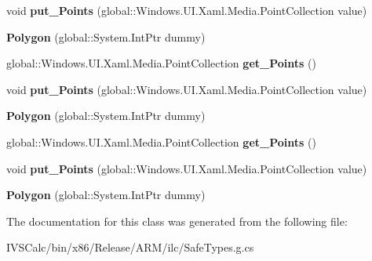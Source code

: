 \begin{DoxyCompactItemize}
\item 
\mbox{\label{class_windows_1_1_u_i_1_1_xaml_1_1_shapes_1_1_polygon_a6e9071faca39d4aa0570ba72edba9c6c}} 
void {\bfseries put\+\_\+\+Points} (global\+::\+Windows.\+U\+I.\+Xaml.\+Media.\+Point\+Collection value)
\item 
\mbox{\label{class_windows_1_1_u_i_1_1_xaml_1_1_shapes_1_1_polygon_a7ac83122ba7ccd42efd565804bca2d0a}} 
{\bfseries Polygon} (global\+::\+System.\+Int\+Ptr dummy)
\item 
\mbox{\label{class_windows_1_1_u_i_1_1_xaml_1_1_shapes_1_1_polygon_afd4470cca2e8e02dfe5091d16a91f6bd}} 
global\+::\+Windows.\+U\+I.\+Xaml.\+Media.\+Point\+Collection {\bfseries get\+\_\+\+Points} ()
\item 
\mbox{\label{class_windows_1_1_u_i_1_1_xaml_1_1_shapes_1_1_polygon_a6e9071faca39d4aa0570ba72edba9c6c}} 
void {\bfseries put\+\_\+\+Points} (global\+::\+Windows.\+U\+I.\+Xaml.\+Media.\+Point\+Collection value)
\item 
\mbox{\label{class_windows_1_1_u_i_1_1_xaml_1_1_shapes_1_1_polygon_a7ac83122ba7ccd42efd565804bca2d0a}} 
{\bfseries Polygon} (global\+::\+System.\+Int\+Ptr dummy)
\item 
\mbox{\label{class_windows_1_1_u_i_1_1_xaml_1_1_shapes_1_1_polygon_afd4470cca2e8e02dfe5091d16a91f6bd}} 
global\+::\+Windows.\+U\+I.\+Xaml.\+Media.\+Point\+Collection {\bfseries get\+\_\+\+Points} ()
\item 
\mbox{\label{class_windows_1_1_u_i_1_1_xaml_1_1_shapes_1_1_polygon_a6e9071faca39d4aa0570ba72edba9c6c}} 
void {\bfseries put\+\_\+\+Points} (global\+::\+Windows.\+U\+I.\+Xaml.\+Media.\+Point\+Collection value)
\item 
\mbox{\label{class_windows_1_1_u_i_1_1_xaml_1_1_shapes_1_1_polygon_a7ac83122ba7ccd42efd565804bca2d0a}} 
{\bfseries Polygon} (global\+::\+System.\+Int\+Ptr dummy)
\end{DoxyCompactItemize}


The documentation for this class was generated from the following file\+:\begin{DoxyCompactItemize}
\item 
I\+V\+S\+Calc/bin/x86/\+Release/\+A\+R\+M/ilc/Safe\+Types.\+g.\+cs\end{DoxyCompactItemize}

